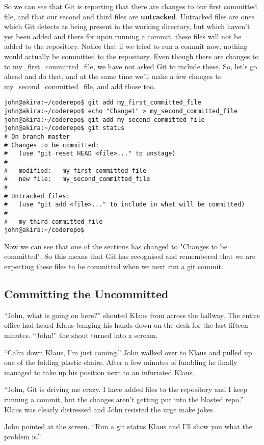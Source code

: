 So we can see that Git is reporting that there are changes to our first committed file, and that our second and third files are \textbf{untracked}.  Untracked files are ones which Git detects as being present in the working directory, but which haven't yet been added and there for upon running a commit, these files will not be added to the repository.  Notice that if we tried to run a commit now, nothing would actually be committed to the repository.  Even though there are changes to to my\_first\_committed\_file, we have not asked Git to include these.  So, let's go ahead and do that, and at the same time we'll make a few changes to my\_second\_committed\_file, and add those too.

\begin{Verbatim}[frame=single,fontsize=\relsize{-3}] 
john@akira:~/coderepo$ git add my_first_committed_file
john@akira:~/coderepo$ echo "Change1" > my_second_committed_file 
john@akira:~/coderepo$ git add my_second_committed_file
john@akira:~/coderepo$ git status
# On branch master
# Changes to be committed:
#   (use "git reset HEAD <file>..." to unstage)
#
#	modified:   my_first_committed_file
#	new file:   my_second_committed_file
#
# Untracked files:
#   (use "git add <file>..." to include in what will be committed)
#
#	my_third_committed_file
john@akira:~/coderepo$ 
\end{Verbatim} 

Now we can see that one of the sections has changed to "Changes to be committed".  So this means that Git has recognised and remembered that we are expecting these files to be committed when we next run a git commit.  

\subsection{Committing the Uncommitted}

\begin{trenches}
``John, what is going on here?'' shouted Klaus from across the hallway.  The entire office had heard Klaus banging his hands down on the desk for the last fifteen minutes.  ``John!'' the shout turned into a scream.

``Calm down Klaus, I'm just coming.''  John walked over to Klaus and pulled up one of the folding plastic chairs.  After a few minutes of fumbling he finally managed to take up his position next to an infuriated Klaus.

``John, Git is driving me crazy.  I have added files to the repository and I keep running a commit, but the changes aren't getting put into the blasted repo.''  Klaus was clearly distressed and John resisted the urge make jokes.

John pointed at the screen.  ``Run a git status Klaus and I'll show you what the problem is.''
\end{trenches}

